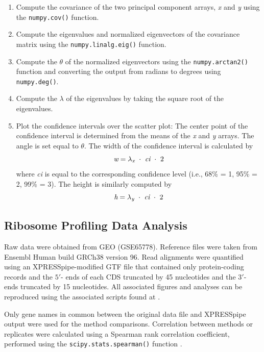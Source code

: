 \documentclass[10pt, oneside]{article}
\begin{document}
\begin{enumerate}
  \item Compute the covariance of the two principal component arrays, \textit{x} and \textit{y} using the \texttt{numpy.cov()} function.

  \item Compute the eigenvalues and normalized eigenvectors of the covariance matrix using the \texttt{numpy.linalg.eig()} function.

  \item Compute the $\theta$ of the normalized eigenvectors using the \texttt{numpy.arctan2()} function and converting the output from radians to degrees using \texttt{numpy.deg()}.

  \item Compute the $\lambda$ of the eigenvalues by taking the square root of the eigenvalues.

  \item Plot the confidence intervals over the scatter plot: The center point of the confidence interval is determined from the means of the \textit{x} and \textit{y} arrays. The angle is set equal to $\theta$. The width of the confidence interval is calculated by
  \[
  \textit{w} = \lambda _{\textit{\scriptsize{x}}}\ \cdot\ \textit{ci}\ \cdot\ 2
  \]
  where \textit{ci} is equal to the corresponding confidence level (i.e., 68\% = 1, 95\% = 2, 99\% = 3). The height is similarly computed by
  \[
  \textit{h} = \lambda _{\textit{\scriptsize{y}}}\ \cdot\ \textit{ci}\ \cdot\ 2
  \]
\end{enumerate}

\subsection{Ribosome Profiling Data Analysis}
Raw data were obtained from GEO (GSE65778). Reference files were taken from Ensembl Human build GRCh38 version 96. Read alignments were quantified using an XPRESSpipe-modified GTF file that contained only protein-coding records and the $5'$- ends of each CDS truncated by 45 nucleotides and the $3'$- ends truncated by 15 nucleotides. All associated figures and analyses can be reproduced using the associated scripts found at \cite{manuscript}. \par

Only gene names in common between the original data file and XPRESSpipe output were used for the method comparisons. Correlation between methods or replicates were calculated using a Spearman rank correlation coefficient, performed using the \texttt{scipy.stats.spearman()} function \cite{spearman_rnaseq}. \par
\end{document}
